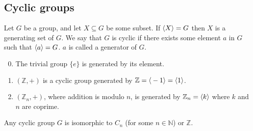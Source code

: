 \subsection{Cyclic groups}
\begin{definition}
	Let \(G\) be a group, and let \(X \subseteq G\) be some subset.
	If \(\langle{} X \rangle = G\) then \(X\) is a generating set of \(G\).
	We say that \(G\) is cyclic if there exists some element \(a\) in \(G\) such that \(\langle{} a \rangle = G\).
	\(a\) is called a generator of \(G\).
\end{definition}
\begin{enumerate}
	\setcounter{enumi}{-1}
	\item The trivial group \(\{ e \}\) is generated by its element.
	\item \((\mathbb Z, +)\) is a cyclic group generated by \(\mathbb Z = \langle{} -1 \rangle = \langle{} 1 \rangle\).
	\item \((\mathbb Z_n, +)\), where addition is modulo \(n\), is generated by \(\mathbb Z_n = \langle{} k \rangle\) where \(k\) and \(n\) are coprime.
\end{enumerate}
\begin{theorem}
	Any cyclic group \(G\) is isomorphic to \(C_n\) (for some \(n \in \mathbb N\)) or \(\mathbb Z\).
\end{theorem}
